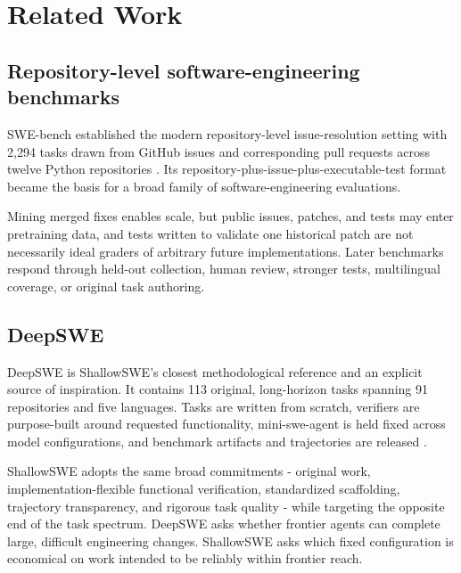 \documentclass[11pt]{article}
\begin{document}
\section{Related Work}\hypertarget{3-related-work}{}\label{3-related-work}

\subsection{Repository-level software-engineering benchmarks}\hypertarget{31-repository-level-software-engineering-benchmarks}{}\label{31-repository-level-software-engineering-benchmarks}

SWE-bench established the modern repository-level issue-resolution setting with 2,294 tasks drawn from GitHub issues and corresponding pull requests across twelve Python repositories \citep{jimenez2024swebench}. Its repository-plus-issue-plus-executable-test format became the basis for a broad family of software-engineering evaluations.

Mining merged fixes enables scale, but public issues, patches, and tests may enter pretraining data, and tests written to validate one historical patch are not necessarily ideal graders of arbitrary future implementations. Later benchmarks respond through held-out collection, human review, stronger tests, multilingual coverage, or original task authoring.

\subsection{DeepSWE}\hypertarget{32-deepswe}{}\label{32-deepswe}

DeepSWE is ShallowSWE's closest methodological reference and an explicit source of inspiration. It contains 113 original, long-horizon tasks spanning 91 repositories and five languages. Tasks are written from scratch, verifiers are purpose-built around requested functionality, mini-swe-agent is held fixed across model configurations, and benchmark artifacts and trajectories are released \citep{huang2026deepswe}.

ShallowSWE adopts the same broad commitments - original work, implementation-flexible functional verification, standardized scaffolding, trajectory transparency, and rigorous task quality - while targeting the opposite end of the task spectrum. DeepSWE asks whether frontier agents can complete large, difficult engineering changes. ShallowSWE asks which fixed configuration is economical on work intended to be reliably within frontier reach.
\end{document}

